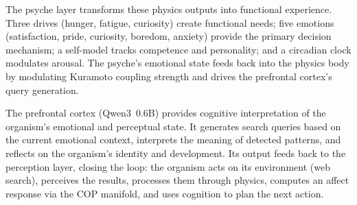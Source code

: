 \documentclass[11pt,a4paper,twocolumn]{article}
\begin{document}
The psyche layer transforms these physics outputs into functional experience.
Three drives (hunger, fatigue, curiosity) create functional needs; five emotions (satisfaction, pride, curiosity, boredom, anxiety) provide the primary decision mechanism; a self-model tracks competence and personality; and a circadian clock modulates arousal.
The psyche's emotional state feeds back into the physics body by modulating Kuramoto coupling strength and drives the prefrontal cortex's query generation.

The prefrontal cortex (Qwen3~0.6B) provides cognitive interpretation of the organism's emotional and perceptual state.
It generates search queries based on the current emotional context, interprets the meaning of detected patterns, and reflects on the organism's identity and development.
Its output feeds back to the perception layer, closing the loop: the organism acts on its environment (web search), perceives the results, processes them through physics, computes an affect response via the COP manifold, and uses cognition to plan the next action.
\end{document}
